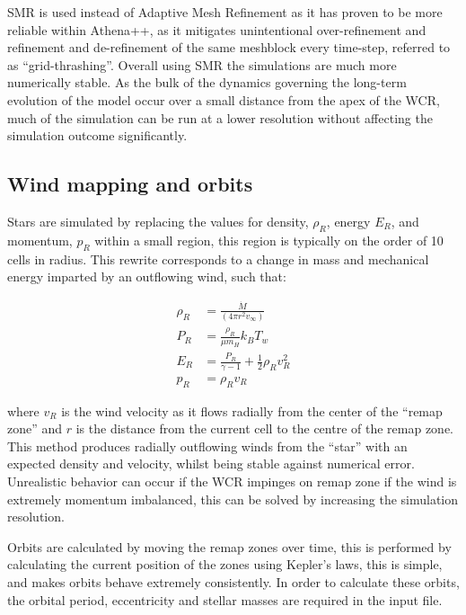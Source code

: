 SMR is used instead of Adaptive Mesh Refinement as it has proven to be more reliable within Athena++, as it mitigates unintentional over-refinement and refinement and de-refinement of the same meshblock every time-step, referred to as ``grid-thrashing''. Overall using SMR the simulations are much more numerically stable. As the bulk of the dynamics governing the long-term evolution of the model occur over a small distance from the apex of the WCR, much of the simulation can be run at a lower resolution without affecting the simulation outcome significantly.


\subsection{Wind mapping and orbits}

Stars are simulated by replacing the values for density, $\rho_R$, energy $E_R$, and momentum, $p_R$ within a small region, this region is typically on the order of 10 cells in radius. This rewrite corresponds to a change in mass and mechanical energy imparted by an outflowing wind, such that:

\begin{subequations}
  \begin{align}
    \rho_R & = \frac{\dot M}{(4 \pi r^2 v_\infty)} \\
    P_R & = \frac{\rho_R}{\mu m_H} k_B T_w \\
    E_R & = \frac{P_R}{\gamma - 1} + \frac{1}{2} \rho_{R} v_{R}^2 \\
    p_{R} & = \rho_R v_{R}
  \end{align}
\end{subequations}


where $v_R$ is the wind velocity as it flows radially from the center of the ``remap zone'' and $r$ is the distance from the current cell to the centre of the remap zone. This method produces radially outflowing winds from the ``star'' with an expected density and velocity, whilst being stable against numerical error. Unrealistic behavior can occur if the WCR impinges on remap zone if the wind is extremely momentum imbalanced, this can be solved by increasing the simulation resolution.

Orbits are calculated by moving the remap zones over time, this is performed by calculating the current position of the zones using Kepler's laws, this is simple, and makes orbits behave extremely consistently. In order to calculate these orbits, the orbital period, eccentricity and stellar masses are required in the input file.


